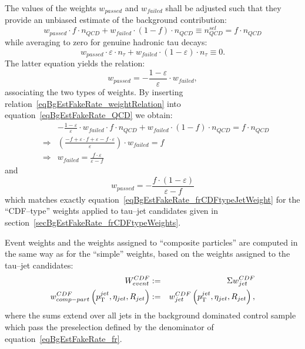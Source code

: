The values of the weights $w_{passed}$ and $w_{failed}$ shall be adjusted such
that they provide an unbiased estimate of the background contribution:
\begin{equation}
w_{passed} \cdot f \cdot n_{QCD} + w_{failed} \cdot \left( 1 - f \right) \cdot n_{QCD} \equiv n_{QCD}^{sel} = f \cdot n_{QCD}
\label{eqBgEstFakeRate_QCD}
\end{equation}
while averaging to zero for genuine hadronic tau decays:
\begin{equation*}
w_{passed} \cdot \varepsilon \cdot n_{\tau} + w_{failed} \cdot \left( 1 - \varepsilon \right) \cdot n_{\tau} \equiv 0.
\label{eqBgEstFakeRate_tau}
\end{equation*}
The latter equation yields the relation:
\begin{equation}
w_{passed} = -\frac{1 - \varepsilon}{\varepsilon} \cdot w_{failed},
\label{eqBgEstFakeRate_weightRelation}
\end{equation}
associating the two types of weights.  By inserting
relation~\ref{eqBgEstFakeRate_weightRelation} into
equation~\ref{eqBgEstFakeRate_QCD} we obtain:
\begin{eqnarray*}
& & -\frac{1 - \varepsilon}{\varepsilon} \cdot w_{failed} \cdot f \cdot n_{QCD} + w_{failed} \cdot \left( 1 - f \right) \cdot n_{QCD} 
 = f \cdot n_{QCD} \\
& \Rightarrow & \left( \frac{-f + \varepsilon \cdot f + \varepsilon - f \cdot \varepsilon}{\varepsilon} \right) \cdot w_{failed} = f \\
& \Rightarrow & w_{failed} = \frac{f \cdot \varepsilon}{\varepsilon - f} 
\end{eqnarray*}
and 
\begin{equation}
w_{passed} = -\frac{f \cdot \left( 1 - \varepsilon \right)}{\varepsilon - f}
\end{equation}
which matches exactly equation~\ref{eqBgEstFakeRate_frCDFtypeJetWeight} 
for the ``CDF--type'' weights applied to tau--jet candidates given in section~\ref{secBgEstFakeRate_frCDFtypeWeights}.


Event weights and the weights assigned to ``composite particles'' 
are computed in the same way as for the ``simple'' weights,
based on the weights assigned to the tau--jet candidates:
\begin{eqnarray}
W_{event}^{CDF} & := & \Sigma w_{jet}^{CDF} \nonumber \\
w_{comp-part}^{CDF} \left( p_{\mathrm{T}}^{jet}, \eta_{jet}, R_{jet} \right) & := & 
  w_{jet}^{CDF} \left( p_{\mathrm{T}}^{jet}, \eta_{jet}, R_{jet} \right),
\label{eqBgEstFakeRate_frCDFtypeEvent_and_CompositeParticleWeight}
\end{eqnarray}
where the sums extend over all jets in the background dominated control sample
which pass the preselection defined by the denominator of
equation~\ref{eqBgEstFakeRate_fr}.

